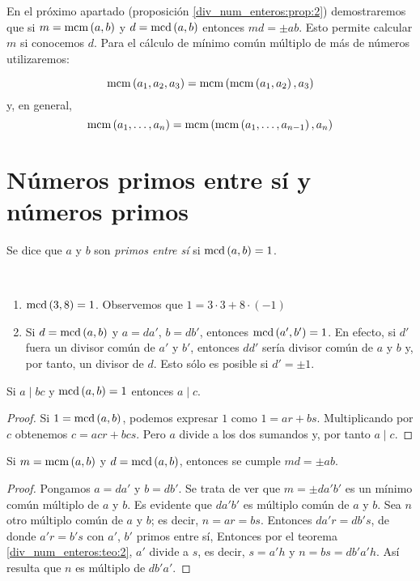 En el próximo apartado (proposición \ref{div_num_enteros:prop:2}) demostraremos que si $m=\operatorname{\rm mcm}\left(a,b\right)$ y $d=\operatorname{\rm mcd}\left(a,b\right)$ entonces $md=\pm ab$. Esto permite calcular $m$ si conocemos $d$. Para el cálculo de mínimo común múltiplo de más de números utilizaremos:
\begin{ejer}   
    $$\operatorname{\rm mcm}\left(a_1,a_2,a_3\right)=\operatorname{\rm mcm}\left(\operatorname{\rm mcm}\left(a_1,a_2\right),a_3\right)$$
    y, en general,
    $$\operatorname{\rm mcm}\left(a_1,\dots,a_n\right)=\operatorname{\rm mcm}\left(\operatorname{\rm mcm}\left(a_1,\dots,a_{n-1}\right),a_n\right)$$        
\end{ejer}

\section{Números primos entre sí y números primos}

Se dice que $a$ y $b$ son {\it primos entre sí} si $\operatorname{\rm mcd}\left(a,b\right)=1$.
\begin{ejs} \
    \begin{enumerate}[label=(\arabic*)]
        \item $\operatorname{\rm mcd}\left(3,8\right)=1$. Observemos que $1=3\cdot 3 + 8\cdot(-1)$
        \item Si $d=\operatorname{\rm mcd}\left(a,b\right)$ y $a=da'$, $b=db'$, entonces $\operatorname{\rm mcd}\left(a',b'\right)=1$. En efecto, si $d'$ fuera un divisor común de $a'$ y $b'$, entonces $dd'$ sería divisor común de $a$ y $b$ y, por tanto, un divisor de $d$. Esto sólo es posible si $d'=\pm 1$.
    \end{enumerate}    
\end{ejs}

\begin{teo}\label{div_num_enteros:teo:2}
    Si $a\mid bc$ y $\operatorname{\rm mcd}\left(a,b\right)=1$ entonces $a\mid c$.
\end{teo}

\begin{proof}
    Si $1=\operatorname{\rm mcd}\left(a,b\right)$, podemos expresar $1$ como $1=ar+bs$. Multiplicando por $c$ obtenemos $c=acr+bcs$. Pero $a$ divide a los dos sumandos y, por tanto $a\mid c$.
\end{proof}

\begin{prop}\label{div_num_enteros:prop:2}
    Si $m=\operatorname{\rm mcm}\left(a,b\right)$ y $d=\operatorname{\rm mcd}\left(a,b\right)$, entonces se cumple $md=\pm ab$.
\end{prop}

\begin{proof}
    Pongamos $a=da'$ y $b=db'$. Se trata de ver que $m=\pm da'b'$ es un mínimo común múltiplo de $a$ y $b$. Es evidente que $da'b'$ es múltiplo común de $a$ y $b$. Sea $n$ otro múltiplo común de $a$ y $b$; es decir, $n=ar=bs$. Entonces $da'r=db's$, de donde $a'r=b's$ con $a'$, $b'$ primos entre sí, Entonces por el teorema \ref{div_num_enteros:teo:2}, $a'$ divide a $s$, es decir, $s=a'h$ y $n=bs=db'a'h$. Así resulta que $n$ es múltiplo de $db'a'$.
\end{proof}

